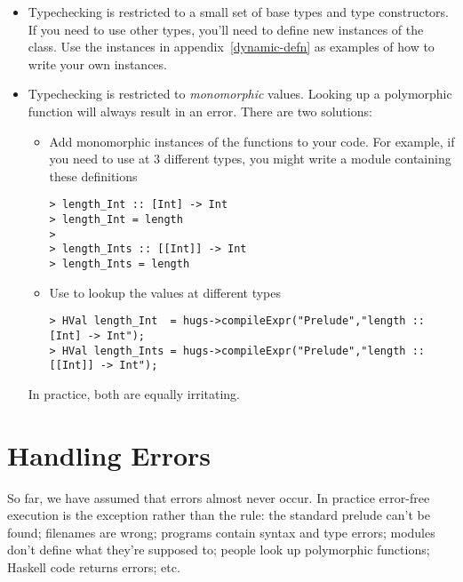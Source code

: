 \begin{itemize}
\item
  Typechecking is restricted to a small set of base types and
  type constructors.  If you need to use other types, you'll need
  to define new instances of the  class.  Use the
  instances in appendix~\ref{dynamic-defn} as examples of how to write
  your own instances.
  
\item
  Typechecking is restricted to {\em monomorphic\/} values.  Looking
  up a polymorphic function will always result in an error.  There 
  are two solutions:
\begin{itemize}
\item
  Add monomorphic instances of the functions to your code.  For example,
  if you need to use  at 3 different types, you 
  might write a module containing these definitions
\begin{verbatim}
> length_Int :: [Int] -> Int
> length_Int = length
> 
> length_Ints :: [[Int]] -> Int
> length_Ints = length
\end{verbatim}

\item
  Use  to lookup the values at different types
\begin{verbatim}
> HVal length_Int  = hugs->compileExpr("Prelude","length :: [Int] -> Int");
> HVal length_Ints = hugs->compileExpr("Prelude","length :: [[Int]] -> Int");
\end{verbatim}

\end{itemize}
In practice, both are equally irritating.

\end{itemize}



\section{Handling Errors}\label{errors}

So far, we have assumed that errors almost never occur.  In practice
error-free execution is the exception rather than the rule: the
standard prelude can't be found; filenames are wrong; programs contain
syntax and type errors; modules don't define what they're supposed to;
people look up polymorphic functions; Haskell code returns errors;
etc.

